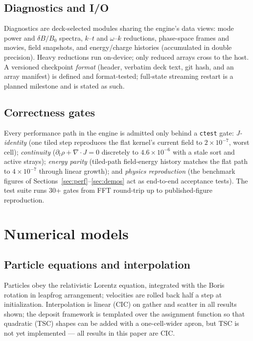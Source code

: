 \documentclass[11pt]{article}
\begin{document}
\subsection{Diagnostics and I/O}
\label{sec:arch-diag}
Diagnostics are deck-selected modules sharing the engine's data views:
mode power and $\delta B/B_0$ spectra, $k$--$t$ and $\omega$--$k$
reductions, phase-space frames and movies, field snapshots, and
energy/charge histories (accumulated in double precision). Heavy
reductions run on-device; only reduced arrays cross to the host.
A versioned checkpoint \emph{format} (header, verbatim deck text, git
hash, and an array manifest) is defined and format-tested; full-state
streaming restart is a planned milestone and is stated as such.

\subsection{Correctness gates}
\label{sec:arch-gates}
Every performance path in the engine is admitted only behind a
\texttt{ctest} gate: \emph{J-identity} (one tiled step reproduces the
flat kernel's current field to $2\times10^{-7}$, worst cell);
\emph{continuity} ($\partial_t\rho+\nabla\cdot J=0$ discretely to
$4.6\times10^{-6}$ with a stale sort and active strays); \emph{energy
parity} (tiled-path field-energy history matches the flat path to
$4\times10^{-7}$ through linear growth); and \emph{physics
reproduction} (the benchmark figures of
Sections~\ref{sec:perf}--\ref{sec:demos} act as end-to-end acceptance
tests). The test suite runs 30+ gates from FFT round-trip up to
published-figure reproduction.

\section{Numerical models}
\label{sec:models}

\subsection{Particle equations and interpolation}
Particles obey the relativistic Lorentz equation, integrated with the
Boris rotation \cite{boris1970} in leapfrog arrangement; velocities are
rolled back half a step at initialization. Interpolation is linear
(CIC) on gather and scatter in all results shown; the deposit framework
is templated over the assignment function so that quadratic (TSC) shapes
can be added with a one-cell-wider apron, but TSC is not yet implemented
--- all results in this paper are CIC.
\end{document}
